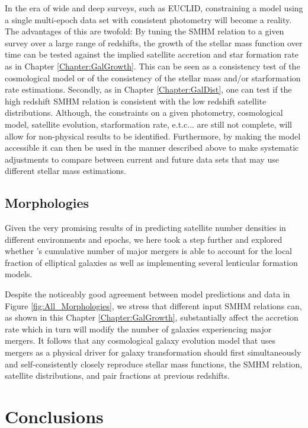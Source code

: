 In the era of wide and deep surveys, such as EUCLID, constraining a model using a single multi-epoch data set with consistent photometry will become a reality. The advantages of this are twofold: By tuning the SMHM relation to a given survey over a large range of redshifts, the growth of the stellar mass function over time can be tested against the implied satellite accretion and star formation rate as in Chapter \ref{Chapter:GalGrowth}. This can be seen as a consistency test of the cosmological model or of the consistency of the stellar mass and/or starformation rate estimations. Secondly, as in Chapter \ref{Chapter:GalDist}, one can test if the high redshift SMHM relation is consistent with the low redshift satellite distributions. Although, the constraints on a given photometry, cosmological model, satellite evolution, starformation rate, e.t.c... are still not complete, \steel will allow for non-physical results to be identified. Furthermore, by making the model accessible it can then be used in the manner described above to make systematic adjustments to compare between current and future data sets that may use different stellar mass estimations.

\subsection{Morphologies}

Given the very promising results of \steel in predicting satellite number densities in different environments and epochs, we here took a step further and explored whether \steel's cumulative number of major mergers is able to account for the local fraction of elliptical galaxies as well as implementing several lenticular formation models. 

Despite the noticeably good agreement between model predictions and data in Figure \ref{fig:All_Morphologies}, we stress that different input SMHM relations can, as shown in this Chapter \ref{Chapter:GalGrowth}, substantially affect the accretion rate which in turn will modify the number of galaxies experiencing major mergers. It follows that any cosmological galaxy evolution model that uses mergers as a physical driver for galaxy transformation should first simultaneously and self-consistently closely reproduce stellar mass functions, the SMHM relation, satellite distributions, and pair fractions at previous redshifts.

\section{Conclusions}
\label{sec:Conclusions}

